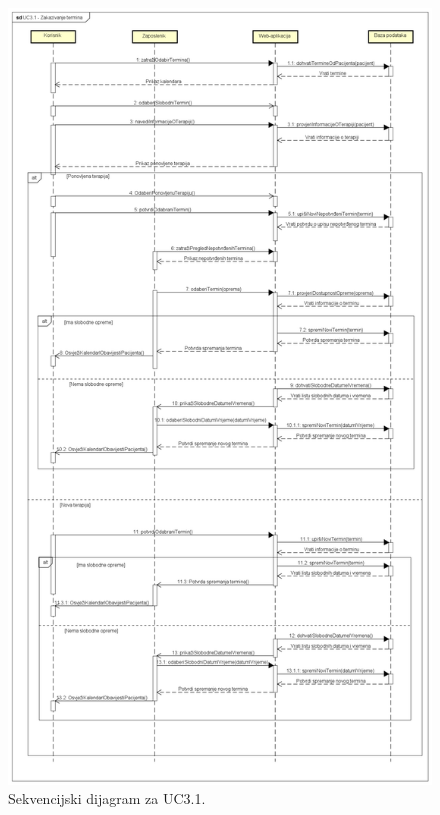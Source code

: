 \begin{figure}[H]
	\includegraphics[scale=0.33]{slike/zakazivanjeTerminaUC3.1}
	\centering
	\caption{Sekvencijski dijagram za UC3.1.}
\end{figure}

\newpage

\textbf{}\\

